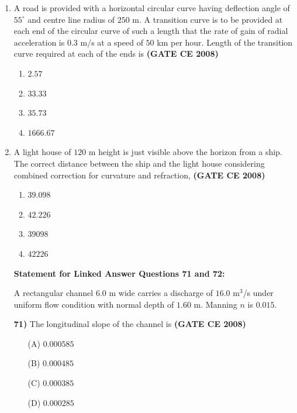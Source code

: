\documentclass[journal]{IEEEtran}
\begin{document}
\begin{enumerate}
\item A road is provided with a horizontal circular curve having deflection angle of $55^\circ$ and centre line radius of $250$ m. A transition curve is to be provided at each end of the circular curve of such a length that the rate of gain of radial acceleration is $0.3$ m/s at a speed of $50$ km per hour. Length of the transition curve required at each of the ends is \textbf{(GATE CE 2008)}
\begin{multicols}{2}
\begin{enumerate}
\item $2.57$ 
\item $33.33$ 
\item $35.73$ 
\item $1666.67$ 
\end{enumerate}  
\end{multicols}

\item A light house of $120$ m height is just visible above the horizon from a ship. The correct distance  between the ship and the light house considering combined correction for curvature and refraction, \textbf{(GATE CE 2008)}
\begin{multicols}{2}
\begin{enumerate}
\item $39.098$ 
\item $42.226$ 
\item $39098$ 
\item $42226$ 
\end{enumerate}  
\end{multicols}

\vspace{4cm}

\textbf{Statement for Linked Answer Questions 71 and 72:}

\vspace{1cm}

A rectangular channel $6.0$ m wide carries a discharge of $16.0$ m$^3$/s under uniform flow condition with normal depth of $1.60$ m. Manning $n$ is $0.015$. 

\vspace{0.5cm}

\textbf{71)} \quad The longitudinal slope of the channel is \textbf{(GATE CE 2008)}

\begin{itemize}
    \item[(A)] $0.000585$
    \item[(B)] $0.000485$
    \item[(C)] $0.000385$
    \item[(D)] $0.000285$
\end{itemize}


\end{enumerate}
\end{document}
